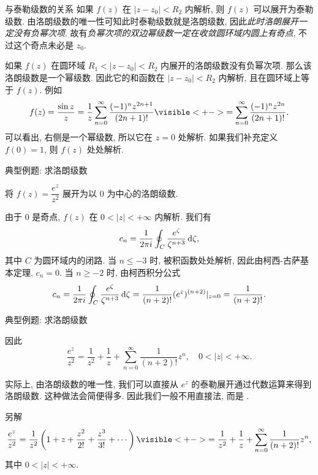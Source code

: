 \begin{frame}{与泰勒级数的关系}
\onslide<+->
如果 $f(z)$ 在 $|z-z_0|<R_2$ 内解析,
\onslide<+->
则 $f(z)$ 可以展开为泰勒级数.
\onslide<+->
由洛朗级数的唯一性可知此时泰勒级数就是洛朗级数,
\onslide<+->
因此\emph{此时洛朗展开一定没有负幂次项}.
\onslide<+->
故有\emph{负幂次项的双边幂级数一定在收敛圆环域内圆上有奇点}, 不过这个奇点未必是 $z_0$.

\onslide<+->
如果 $f(z)$ 在圆环域 $R_1<|z-z_0|<R_2$ 内展开的洛朗级数没有负幂次项.
\onslide<+->
那么该洛朗级数是一个幂级数.
\onslide<+->
因此它的和函数在 $|z-z_0|<R_2$ 内解析, 且在圆环域上等于 $f(z)$.
\onslide<+->
例如
\[f(z)=\frac{\sin z}z=\frac 1z\sum_{n=0}^\infty\frac{(-1)^nz^{2n+1}}{(2n+1)!}
\visible<+->{=\sum_{n=0}^\infty\frac{(-1)^nz^{2n}}{(2n+1)!}.}\]
\onslide<+->
可以看出, 右侧是一个幂级数, 所以它在 $z=0$ 处解析.
\onslide<+->
如果我们补充定义 $f(0)=1$, 则 $f(z)$ 处处解析.
\end{frame}


\begin{frame}{典型例题: 求洛朗级数}
\beqskip{9pt}
\begin{example}
将 $f(z)=\dfrac{e^z}{z^2}$ 展开为以 $0$ 为中心的洛朗级数.
\end{example}
\begin{solution}
由于 $0$ 是奇点, $f(z)$ 在 $0<|z|<+\infty$ 内解析.
\onslide<+->
我们有
\[c_n=\frac1{2\pi i}\oint_C\frac{e^\zeta}{\zeta^{n+3}}\,\mathrm{d}\zeta,\]
其中 $C$ 为圆环域内的闭路.
\onslide<+->
当 $n\le -3$ 时, 被积函数处处解析, 因此由柯西-古萨基本定理, $c_n=0$.
\onslide<+->
当 $n\ge -2$ 时, 由柯西积分公式
\[c_n=\frac1{2\pi i}\oint_C\frac{e^\zeta}{\zeta^{n+3}}\,\mathrm{d}\zeta
=\frac1{(n+2)!}(e^z)^{(n+2)}|_{z=0}=\frac1{(n+2)!}.\]
\end{solution}
\endgroup
\end{frame}


\begin{frame}{典型例题: 求洛朗级数}
\begin{solutionc}
因此
\vspace{-\baselineskip}
\[\frac{e^z}{z^2}=\frac1{z^2}+\frac1z+\sum_{n=0}^\infty \frac1{(n+2)!}z^n,\quad 0<|z|<+\infty.\]
\vspace{-10pt}
\end{solutionc}
\onslide<+->
实际上, 由洛朗级数的唯一性, 我们可以直接从 $e^z$ 的泰勒展开通过代数运算来得到洛朗级数.
\onslide<+->
这种做法会简便得多.
\onslide<+->
因此我们一般\alert{不用直接法}, 而是 .
\begin{block}{另解}
\vspace{-\baselineskip}
\[\frac{e^z}{z^2}=\frac1{z^2}\left(1+z+\frac{z^2}{2!}+\frac{z^3}{3!}+\cdots\right)
\visible<+->{=\frac1{z^2}+\frac1z+\sum_{n=0}^\infty \frac1{(n+2)!}z^n,}\]
其中 $0<|z|<+\infty$.
\end{block}
\end{frame}


